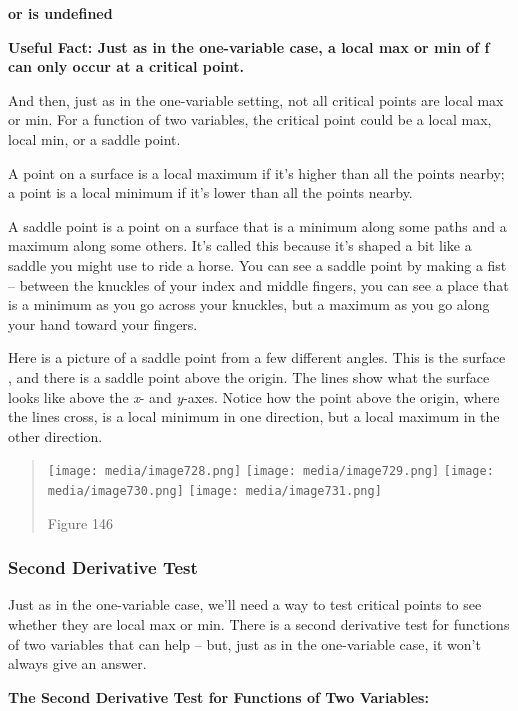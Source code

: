 \textbf{or is undefined}

\textbf{Useful Fact: Just as in the one-variable case, a local max or
min of f can only occur at a critical point.}

And then, just as in the one-variable setting, not all critical points
are local max or min. For a function of two variables, the critical
point could be a local max, local min, or a saddle point.

A point on a surface is a local maximum if it's higher than all the
points nearby; a point is a local minimum if it's lower than all the
points nearby.

A saddle point is a point on a surface that is a minimum along some
paths and a maximum along some others. It's called this because it's
shaped a bit like a saddle you might use to ride a horse. You can see a
saddle point by making a fist -- between the knuckles of your index and
middle fingers, you can see a place that is a minimum as you go across
your knuckles, but a maximum as you go along your hand toward your
fingers.

Here is a picture of a saddle point from a few different angles. This is
the surface , and there is a saddle point above the origin. The lines
show what the surface looks like above the \emph{x}- and \emph{y}-axes.
Notice how the point above the origin, where the lines cross, is a local
minimum in one direction, but a local maximum in the other direction.

\begin{quote}
\texttt{[image: media/image728.png]}
\texttt{[image: media/image729.png]}
\texttt{[image: media/image730.png]}
\texttt{[image: media/image731.png]}

Figure 146
\end{quote}

\subsubsection{Second Derivative Test}\label{second-derivative-test}

Just as in the one-variable case, we'll need a way to test critical
points to see whether they are local max or min. There is a second
derivative test for functions of two variables that can help -- but,
just as in the one-variable case, it won't always give an answer.

\textbf{The Second Derivative Test for Functions of Two Variables:}


